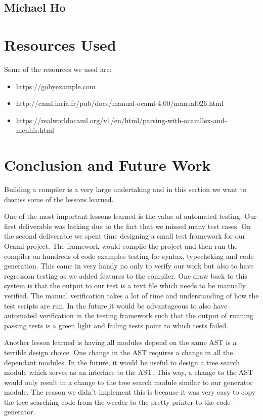 \documentclass{article}
\begin{document}
\subsection{Michael Ho}


\section{Resources Used}
Some of the resources we used are: 

\begin{itemize}
\item https://gobyexample.com  
\item http://caml.inria.fr/pub/docs/manual-ocaml-4.00/manual026.html
\item https://realworldocaml.org/v1/en/html/parsing-with-ocamllex-and-menhir.html
\end{itemize}


\section{Conclusion and Future Work}
Building a compiler is a very large undertaking and in this section we want to discuss some of the lessons learned.


One of the most important lessons learned is the value of automated testing. Our first deliverable was lacking due to the fact that we missed many test cases. On the second deliverable we spent time designing a small test framework for our Ocaml project. The framework would compile the project and then run the compiler on hundreds of code examples testing for syntax, typecheking and code generation. This came in very handy no only to verify our work but also to have regression testing as we added features to the compiler. One draw back to this system is that the output to our test is a text file which needs to be manually verified. The manual verification takes a lot of time and understanding of how the test scripts are run. In the future it would be advantageous to also have automated verification in the testing framework such that the output of running passing tests is a green light and failing tests point to which tests failed. 


Another lesson learned is having all modules depend on the same AST is a terrible design choice. One change in the AST requires a change in all the dependant modules. In the future, it would be useful to design a tree search module which serves as an interface to the AST. This way, a change to the AST would only result in a change to the tree search module similar to our generator module. The reason we didn't implement this is because it was very easy to copy the tree searching code from the weeder to the pretty printer to the code-generator. 




\end{document}
